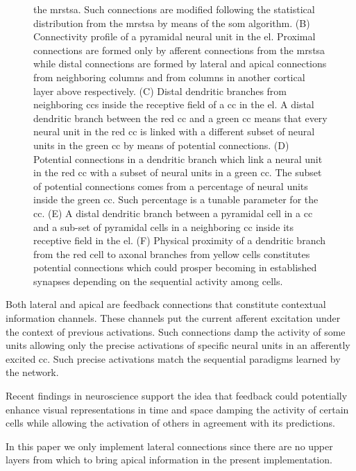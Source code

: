 \documentclass[10pt,letterpaper]{article}
\begin{document}
\begin{figure}[h!]
{    the \gls{mrstsa}.
    Such connections are modified following the statistical distribution from the \gls{mrstsa}
    by means of the \gls{som} algorithm.
    (B) Connectivity profile of a pyramidal neural unit in the \gls{el}.
    Proximal connections are formed only by afferent connections from the \gls{mrstsa}
    while distal connections are formed by lateral and apical connections from neighboring columns and
    from columns in another cortical layer above respectively.
    (C) Distal dendritic branches from neighboring \glspl{cc} inside the receptive field
    of a \gls{cc} in the \gls{el}. A distal dendritic branch between the red \gls{cc} and a
    green \gls{cc} means that every neural unit in the red \gls{cc} is linked with a different
    subset of neural units in the green \gls{cc} by means of potential connections.
    (D) Potential connections in a dendritic branch which link a neural unit in the red \gls{cc}
    with a subset of neural units in a green \gls{cc}. The subset of potential connections comes from a percentage of neural units
    inside the green \gls{cc}. Such percentage is a tunable parameter for the \gls{cc}.
    (E) A distal dendritic branch between a pyramidal cell in a \gls{cc} and a 
    sub-set of pyramidal cells in a neighboring \gls{cc} inside its receptive field
    in the \gls{el}.
    (F) Physical proximity of a dendritic branch from the red cell to axonal branches from yellow cells constitutes potential connections
    which could prosper becoming in established synapses depending on the sequential activity among cells.}
    \label{fig:Connectivity}
\end{figure}
\fi

Both lateral and apical are feedback connections that constitute contextual information channels. 
These channels put the current afferent excitation under the context of previous activations.
Such connections damp the activity of some units allowing only the precise activations
of specific neural units in an afferently excited \gls{cc}.
Such precise activations match the sequential paradigms learned by the network.

Recent findings in neuroscience \cite{Marques2018} support the idea 
that feedback could potentially enhance visual representations in time and space
damping the activity of certain cells while allowing the 
activation
of others
in agreement
with its predictions.

In this paper we only implement lateral connections since
there are no upper layers 
from which to bring apical information in the present implementation.
\end{document}

